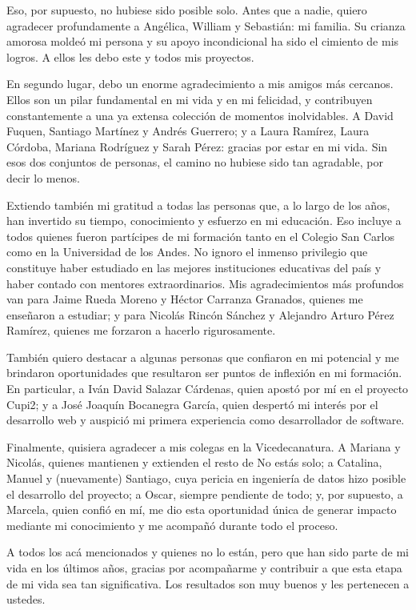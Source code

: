 Eso, por supuesto, no hubiese sido posible solo. Antes que a nadie, quiero agradecer profundamente a Angélica, William y Sebastián: mi familia. Su crianza amorosa moldeó mi persona y su apoyo incondicional ha sido el cimiento de mis logros. A ellos les debo este y todos mis proyectos.

En segundo lugar, debo un enorme agradecimiento a mis amigos más cercanos. Ellos son un pilar fundamental en mi vida y en mi felicidad, y contribuyen constantemente a una ya extensa colección de momentos inolvidables. A David Fuquen, Santiago Martínez y Andrés Guerrero; y a Laura Ramírez, Laura Córdoba, Mariana Rodríguez y Sarah Pérez: gracias por estar en mi vida. Sin esos dos conjuntos de personas, el camino no hubiese sido tan agradable, por decir lo menos.

Extiendo también mi gratitud a todas las personas que, a lo largo de los años, han invertido su tiempo, conocimiento y esfuerzo en mi educación. Eso incluye a todos quienes fueron partícipes de mi formación tanto en el Colegio San Carlos como en la Universidad de los Andes. No ignoro el inmenso privilegio que constituye haber estudiado en las mejores instituciones educativas del país y haber contado con mentores extraordinarios. Mis agradecimientos más profundos van para Jaime Rueda Moreno y Héctor Carranza Granados, quienes me enseñaron a estudiar; y para Nicolás Rincón Sánchez y Alejandro Arturo Pérez Ramírez, quienes me forzaron a hacerlo rigurosamente.

También quiero destacar a algunas personas que confiaron en mi potencial y me brindaron oportunidades que resultaron ser puntos de inflexión en mi formación. En particular, a Iván David Salazar Cárdenas, quien apostó por mí en el proyecto Cupi2; y a José Joaquín Bocanegra García, quien despertó mi interés por el desarrollo web y auspició mi primera experiencia como desarrollador de software.

Finalmente, quisiera agradecer a mis colegas en la Vicedecanatura. A Mariana y Nicolás, quienes mantienen y extienden el resto de No estás solo; a Catalina, Manuel y (nuevamente) Santiago, cuya pericia en ingeniería de datos hizo posible el desarrollo del proyecto; a Oscar, siempre pendiente de todo; y, por supuesto, a Marcela, quien confió en mí, me dio esta oportunidad única de generar impacto mediante mi conocimiento y me acompañó durante todo el proceso.

A todos los acá mencionados y quienes no lo están, pero que han sido parte de mi vida en los últimos años, gracias por acompañarme y contribuir a que esta etapa de mi vida sea tan significativa. Los resultados son muy buenos y les pertenecen a ustedes. 
